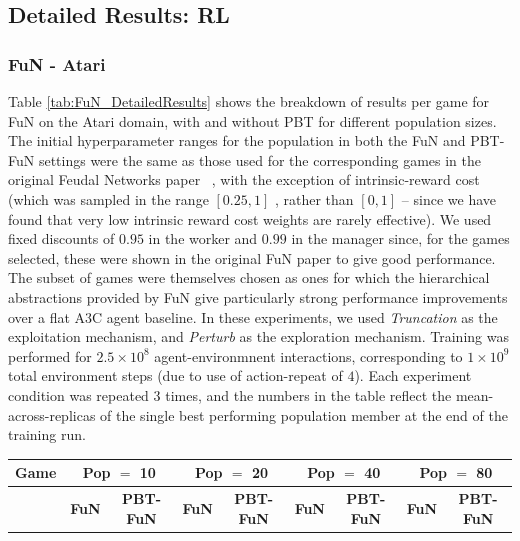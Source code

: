 \begin{appendices}
\subsection{Detailed Results: RL}\label{sec:detailed_results_RL}


\subsubsection*{FuN - Atari}

Table \ref{tab:FuN_DetailedResults} shows the breakdown of results per game for FuN on the Atari domain, with and without PBT for different population sizes. The initial hyperparameter ranges for the population in both the FuN and PBT-FuN settings were the same as those used for the corresponding games in the original Feudal Networks paper ~\citep{vezhnevets2017feudal}, with the exception of intrinsic-reward cost (which was sampled in the range $[0.25, 1]$ , rather than $[0,1]$ -- since we have found that very low intrinsic reward cost weights are rarely effective). We used fixed discounts of $0.95$ in the worker and $0.99$ in the manager since, for the games selected, these were shown in the original FuN paper to give good performance. The subset of games were themselves chosen as ones for which the hierarchical abstractions provided by FuN give particularly strong performance improvements over a flat A3C agent baseline. In these experiments, we used \emph{Truncation} as the exploitation mechanism, and \emph{Perturb} as the exploration mechanism. Training was performed for $2.5\times 10^8$ agent-environmnent interactions, corresponding to $1\times 10^9$ total environment steps (due to use of action-repeat of $4$). Each experiment condition was repeated $3$ times, and the numbers in the table reflect the mean-across-replicas of the single best performing population member at the end of the training run.

\begin{table}[h]
\scriptsize
    \begin{center}
    \begin{tabular}
    {lcccccccc}
    \toprule
      \textbf{Game}  & \multicolumn{2}{c}{\textbf{Pop $=$ 10 }} &\multicolumn{2}{c}{\textbf{Pop $=$ 20 }} & \multicolumn{2}{c}{\textbf{Pop $=$ 40 }} & \multicolumn{2}{c}{\textbf{Pop $=$ 80 }} \\ 
    \midrule
    & \textbf{FuN} & \textbf{PBT-FuN}  & \textbf{FuN} & \textbf{PBT-FuN}  & \textbf{FuN} & \textbf{PBT-FuN}  & \textbf{FuN} & \textbf{PBT-FuN} \\ 
    

\end{tabular}
\end{center}
\end{table}
\end{appendices}
